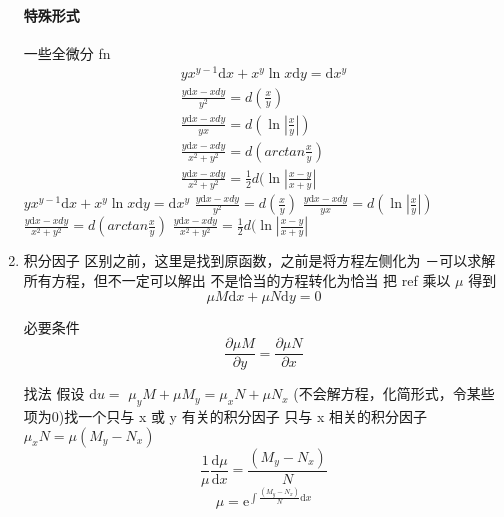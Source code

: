 \documentclass[11pt]{report}
\begin{document}
\begin{enumerate}
\paragraph{特殊形式}
一些全微分
fn
\begin{eqnarray}
\label{eq:36}
yx^{y-1}\mathrm{d}x+x^y\ln x \mathrm{d}y=\mathrm{d}x^{y}\\
\frac{y\mathrm{d}x-xdy}{y^{2}}=d(\frac{x}{y})\\
\frac{y\mathrm{d}x-xdy}{yx}=d(\ln \left| \frac{x}{y} \right|)\\
\frac{y\mathrm{d}x-xdy}{x^{2}+y^{2}}=d(arctan \frac{x}{y})\\
\frac{y\mathrm{d}x-xdy}{x^{2}+y^{2}}=\frac{1}{2}d(\ln \left| \frac{x-y}{x+y} \right|
\end{eqnarray}
\(yx^{y-1}\mathrm{d}x+x^y\ln x \mathrm{d}y=\mathrm{d}x^{y}\)
\(\frac{y\mathrm{d}x-xdy}{y^{2}}=d(\frac{x}{y})\)
\(\frac{y\mathrm{d}x-xdy}{yx}=d(\ln \left| \frac{x}{y} \right|)\)
\(\frac{y\mathrm{d}x-xdy}{x^{2}+y^{2}}=d(arctan \frac{x}{y})\)
\(\frac{y\mathrm{d}x-xdy}{x^{2}+y^{2}}=\frac{1}{2}d(\ln \left| \frac{x-y}{x+y} \right|\)
\item 积分因子
\label{sec:org1fa566e}
区别之前，这里是找到原函数，之前是将方程左侧化为
－可以求解所有方程，但不一定可以解出
不是恰当的方程转化为恰当
把
ref
乘以 \(\mu\)
得到
\begin{equation}
\label{eq:25}
\mu M\mathrm{d}x+\mu N\mathrm{d}y=0
\end{equation}

必要条件
\begin{equation}
\label{eq:23}
\frac{\partial \mu M}{\partial y}=\frac{\partial \mu N}{\partial x}
\end{equation}

找法
假设 \(\mathrm{d}u=\)
\(\mu_y M+\mu M_y=\mu_x N+\mu N_x\)
(不会解方程，化简形式，令某些项为0)找一个只与 x 或 y 有关的积分因子
只与 x 相关的积分因子
\(\mu_xN=\mu(M_y-N_x)\)
\begin{equation}
\label{eq:24}
\frac{1}{\mu}\frac{\mathrm{d}\mu}{\mathrm{d}x}
=\frac{(M_y-N_x)}{N} 
\end{equation}
\begin{equation}
\label{eq:26}
\mu=\mathrm{e}^{\int \frac{(M_y-N_x)}{N} \mathrm{d}x}
\end{equation}


\end{enumerate}
\end{document}
